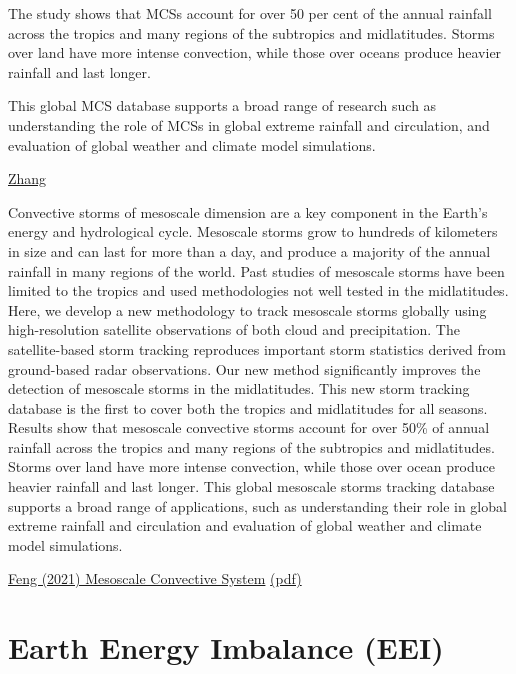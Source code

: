 \documentclass[
]{book}
\begin{document}
The study shows that MCSs account for over 50 per cent of the annual rainfall across the tropics and many regions of the subtropics and midlatitudes. Storms over land have more intense convection, while those over oceans produce heavier rainfall and last longer.

This global MCS database supports a broad range of research such as understanding the role of MCSs in global extreme rainfall and circulation, and evaluation of global weather and climate model simulations.

\href{https://eos.org/editor-highlights/new-global-mesoscale-convective-system-tracking-database}{Zhang}

Convective storms of mesoscale dimension are a key component
in the Earth's energy and hydrological cycle. Mesoscale storms grow to hundreds of kilometers in size
and can last for more than a day, and produce a majority of the annual rainfall in many regions of the
world. Past studies of mesoscale storms have been limited to the tropics and used methodologies not well
tested in the midlatitudes. Here, we develop a new methodology to track mesoscale storms globally using
high-resolution satellite observations of both cloud and precipitation. The satellite-based storm tracking
reproduces important storm statistics derived from ground-based radar observations. Our new method
significantly improves the detection of mesoscale storms in the midlatitudes. This new storm tracking
database is the first to cover both the tropics and midlatitudes for all seasons. Results show that mesoscale
convective storms account for over 50\% of annual rainfall across the tropics and many regions of the
subtropics and midlatitudes. Storms over land have more intense convection, while those over ocean
produce heavier rainfall and last longer. This global mesoscale storms tracking database supports a broad
range of applications, such as understanding their role in global extreme rainfall and circulation and
evaluation of global weather and climate model simulations.

\href{https://agupubs.onlinelibrary.wiley.com/doi/10.1029/2020JD034202}{Feng (2021) Mesoscale Convective System}
\href{pdf/Feng_2021_Mesoscale_Convective_System.pdf}{(pdf)}

\hypertarget{earth-energy-imbalance-eei}{%
\section{Earth Energy Imbalance (EEI)}\label{earth-energy-imbalance-eei}}
\end{document}
